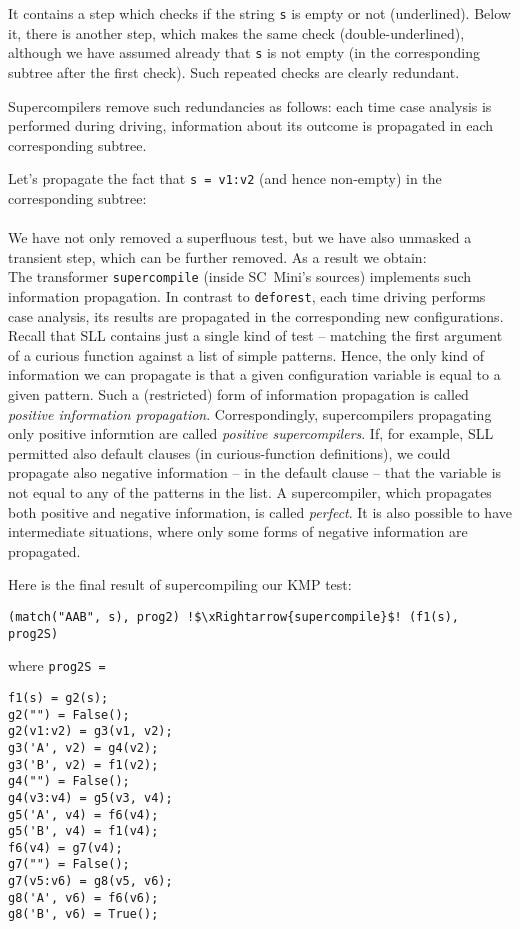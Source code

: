 It contains a step which checks if the string \texttt{s} is empty or not (underlined).
Below it, there is another step, which makes the same check (double-underlined),
although we have assumed already that \texttt{s} is not empty 
(in the corresponding subtree after the first check). 
Such repeated checks are clearly redundant.

Supercompilers remove such redundancies as follows:
each time case analysis is performed during driving,
information about its outcome is propagated in each corresponding subtree.

Let's propagate the fact that \texttt{s = v1:v2} (and hence non-empty) in the corresponding subtree:\\
\\
We have not only removed a superfluous test, but we have also unmasked
a transient step, which can be further removed.
As a result we obtain:\\


The transformer \texttt{supercompile} (inside SC~Mini's sources) implements such information propagation.
In contrast to \texttt{deforest}, each time driving performs case analysis,
its results are propagated in the corresponding new configurations.
Recall that SLL contains just a single kind of test -- matching the first argument of 
a curious function against a list of simple patterns.
Hence, the only kind of information we can propagate is that
a given configuration variable is equal to a given pattern.
Such a (restricted) form of information propagation is 
called \emph{positive information propagation}.
Correspondingly, supercompilers propagating only positive informtion
are called \emph{positive supercompilers}.
If, for example, SLL permitted also default clauses
(in curious-function definitions), we could propagate 
also negative information -- in the default clause -- that
the variable is not equal to any of the patterns in the list.
A supercompiler, which propagates both positive and negative information,
is called \emph{perfect}. It is also possible to have intermediate 
situations, where only some forms of negative information are propagated.

Here is the final result of supercompiling our KMP test:
\begin{lstlisting}[language=sll,escapechar=!]
(match("AAB", s), prog2) !$\xRightarrow{supercompile}$! (f1(s), prog2S)
\end{lstlisting}
where \texttt{prog2S = }
\begin{lstlisting}[language=sll]
f1(s) = g2(s);
g2("") = False();
g2(v1:v2) = g3(v1, v2);
g3('A', v2) = g4(v2);
g3('B', v2) = f1(v2);
g4("") = False();
g4(v3:v4) = g5(v3, v4);
g5('A', v4) = f6(v4);
g5('B', v4) = f1(v4);
f6(v4) = g7(v4);
g7("") = False();
g7(v5:v6) = g8(v5, v6);
g8('A', v6) = f6(v6);
g8('B', v6) = True();
\end{lstlisting}

